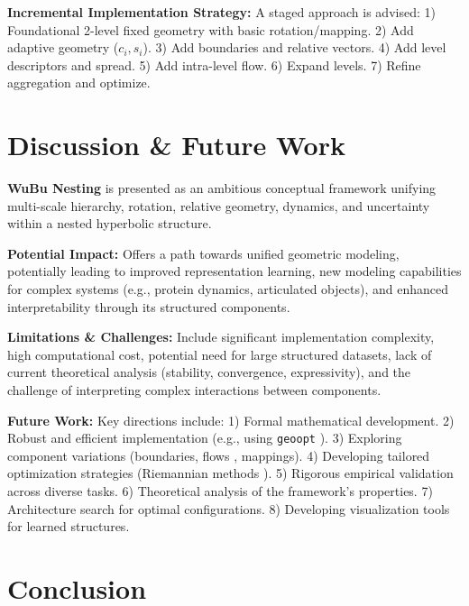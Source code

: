 \documentclass[11pt, twoside]{article} %
\newcommand{\wubu}{\textbf{WuBu Nesting}} %
\begin{document}
\textbf{Incremental Implementation Strategy:} A staged approach is advised: 1) Foundational 2-level fixed geometry with basic rotation/mapping. 2) Add adaptive geometry ($c_i, s_i$). 3) Add boundaries and relative vectors. 4) Add level descriptors and spread. 5) Add intra-level flow. 6) Expand levels. 7) Refine aggregation and optimize.

\section{Discussion \& Future Work}
\label{sec:discussion}

\wubu{} is presented as an ambitious conceptual framework unifying multi-scale hierarchy, rotation, relative geometry, dynamics, and uncertainty within a nested hyperbolic structure.

\textbf{Potential Impact:} Offers a path towards unified geometric modeling, potentially leading to improved representation learning, new modeling capabilities for complex systems (e.g., protein dynamics, articulated objects), and enhanced interpretability through its structured components.

\textbf{Limitations \& Challenges:} Include significant implementation complexity, high computational cost, potential need for large structured datasets, lack of current theoretical analysis (stability, convergence, expressivity), and the challenge of interpreting complex interactions between components.

\textbf{Future Work:} Key directions include: 1) Formal mathematical development. 2) Robust and efficient implementation (e.g., using \texttt{geoopt} \cite{KochurovEtAl2020}). 3) Exploring component variations (boundaries, flows \cite{ChenEtAl2018}, mappings). 4) Developing tailored optimization strategies (Riemannian methods \cite{BecigneulGanea2019}). 5) Rigorous empirical validation across diverse tasks. 6) Theoretical analysis of the framework's properties. 7) Architecture search for optimal configurations. 8) Developing visualization tools for learned structures.

\section{Conclusion}
\label{sec:conclusion}
\end{document}
